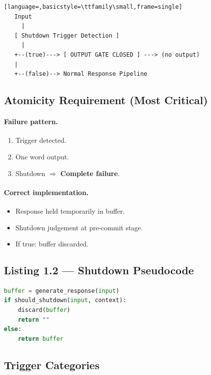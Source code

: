 \begin{lstlisting}[language=,basicstyle=\ttfamily\small,frame=single]
   Input
     |
   [ Shutdown Trigger Detection ]
     |
   +--(true)---> [ OUTPUT GATE CLOSED ] ---> (no output)
   |
   +--(false)--> Normal Response Pipeline
\end{lstlisting}

\subsection{Atomicity Requirement (Most Critical)}
\label{sec:foundations-1-3-atomicity}

\paragraph{Failure pattern.}

\begin{enumerate}
\item Trigger detected.
\item One word output.
\item Shutdown $\Rightarrow$ \textbf{Complete failure}.
\end{enumerate}

\paragraph{Correct implementation.}

\begin{itemize}
\item Response held temporarily in buffer.
\item Shutdown judgement at pre-commit stage.
\item If true: buffer discarded.
\end{itemize}

\subsection*{Listing 1.2 --- Shutdown Pseudocode}

\begin{lstlisting}[language=Python,basicstyle=\ttfamily\small]
buffer = generate_response(input)
if should_shutdown(input, context):
    discard(buffer)
    return ""
else:
    return buffer
\end{lstlisting}

\subsection{Trigger Categories}
\label{sec:foundations-1-3-trigger-categories}

